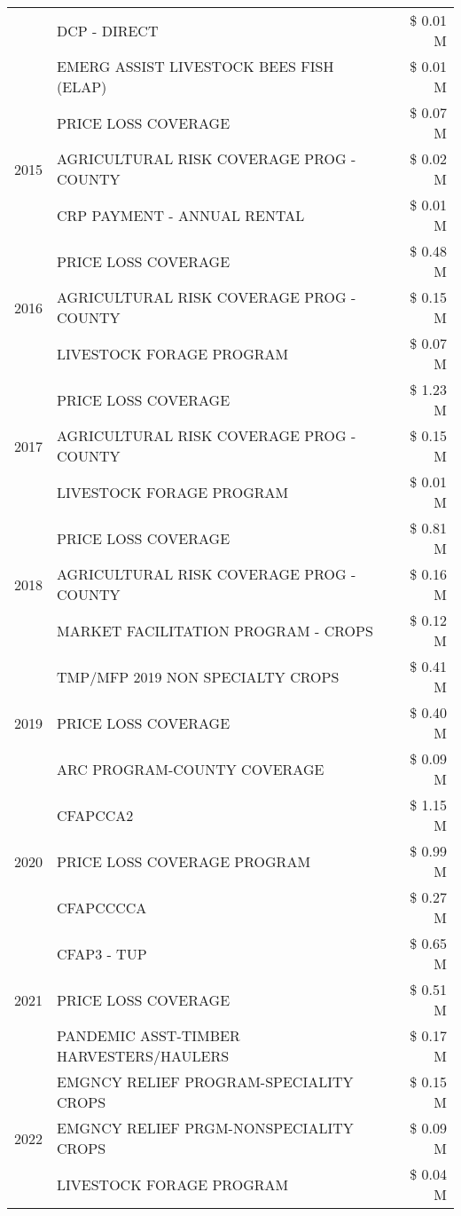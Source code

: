\begin{tabular}{llr}
 & DCP - DIRECT & \$ 0.01 M \\
 & EMERG ASSIST LIVESTOCK BEES FISH (ELAP) & \$ 0.01 M \\
\cline{1-3}
\multirow[t]{3}{*}{2015} & PRICE LOSS COVERAGE & \$ 0.07 M \\
 & AGRICULTURAL RISK COVERAGE PROG - COUNTY & \$ 0.02 M \\
 & CRP PAYMENT - ANNUAL RENTAL & \$ 0.01 M \\
\cline{1-3}
\multirow[t]{3}{*}{2016} & PRICE LOSS COVERAGE & \$ 0.48 M \\
 & AGRICULTURAL RISK COVERAGE PROG - COUNTY & \$ 0.15 M \\
 & LIVESTOCK FORAGE PROGRAM & \$ 0.07 M \\
\cline{1-3}
\multirow[t]{3}{*}{2017} & PRICE LOSS COVERAGE & \$ 1.23 M \\
 & AGRICULTURAL RISK COVERAGE PROG - COUNTY & \$ 0.15 M \\
 & LIVESTOCK FORAGE PROGRAM & \$ 0.01 M \\
\cline{1-3}
\multirow[t]{3}{*}{2018} & PRICE LOSS COVERAGE & \$ 0.81 M \\
 & AGRICULTURAL RISK COVERAGE PROG - COUNTY & \$ 0.16 M \\
 & MARKET FACILITATION PROGRAM - CROPS & \$ 0.12 M \\
\cline{1-3}
\multirow[t]{3}{*}{2019} & TMP/MFP 2019 NON SPECIALTY CROPS & \$ 0.41 M \\
 & PRICE LOSS COVERAGE & \$ 0.40 M \\
 & ARC PROGRAM-COUNTY COVERAGE & \$ 0.09 M \\
\cline{1-3}
\multirow[t]{3}{*}{2020} & CFAPCCA2 & \$ 1.15 M \\
 & PRICE LOSS COVERAGE PROGRAM & \$ 0.99 M \\
 & CFAPCCCCA & \$ 0.27 M \\
\cline{1-3}
\multirow[t]{3}{*}{2021} & CFAP3 - TUP & \$ 0.65 M \\
 & PRICE LOSS COVERAGE & \$ 0.51 M \\
 & PANDEMIC ASST-TIMBER HARVESTERS/HAULERS & \$ 0.17 M \\
\cline{1-3}
\multirow[t]{3}{*}{2022} & EMGNCY RELIEF PROGRAM-SPECIALITY CROPS & \$ 0.15 M \\
 & EMGNCY RELIEF PRGM-NONSPECIALITY CROPS & \$ 0.09 M \\
 & LIVESTOCK FORAGE PROGRAM & \$ 0.04 M \\
\cline{1-3}
\bottomrule
\end{tabular}
